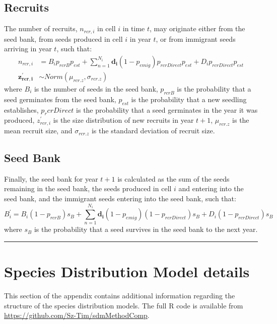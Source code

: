 \documentclass[]{article}
\begin{document}
\subsection{Recruits}

The number of recruits, \(n_{rcr,i}\) in cell \(i\) in time \(t\), may
originate either from the seed bank, from seeds produced in cell \(i\)
in year \(t\), or from immigrant seeds arriving in year \(t\), such
that: \begin{align}
n_{rcr,i} &= B_i p_{rcrB}p_{est} + \sum\limits_{n=1}^{N_i} \boldsymbol{d_i}(1-p_{emig})p_{rcrDirect}p_{est} + D_i p_{rcrDirect}p_{est}\\
\boldsymbol{z^{\prime}_{rcr,i}} &\sim Norm(\mu_{rcr.z}, \sigma_{rcr.z})
\end{align} where \(B_i\) is the number of seeds in the seed bank,
\(p_{rcrB}\) is the probability that a seed germinates from the seed
bank, \(p_{est}\) is the probability that a new seedling establishes,
\(p_rcrDirect\) is the probability that a seed germinates in the year it
was produced, \(z^{\prime}_{rcr,i}\) is the size distribution of new
recruits in year \(t+1\), \(\mu_{rcr.z}\) is the mean recruit size, and
\(\sigma_{rcr.z}\) is the standard deviation of recruit size.

\subsection{Seed Bank}

Finally, the seed bank for year \(t+1\) is calculated as the sum of the
seeds remaining in the seed bank, the seeds produced in cell \(i\) and
entering into the seed bank, and the immigrant seeds entering into the
seed bank, such that: \begin{equation}
B^{\prime}_i = B_i(1-p_{rcrB})s_B + \sum\limits_{n=1}^{N_i} \boldsymbol{d_i}(1-p_{emig})(1-p_{rcrDirect})s_B + D_i(1-p_{rcrDirect})s_B
\end{equation} where \(s_B\) is the probability that a seed survives in
the seed bank to the next year.

\begin{center}\rule{0.5\linewidth}{\linethickness}\end{center}

\newpage
\section{Species Distribution Model details}

This section of the appendix contains additional information regarding
the structure of the species distribution models. The full R code is
available from \url{https://github.com/Sz-Tim/sdmMethodComp}.
\end{document}
